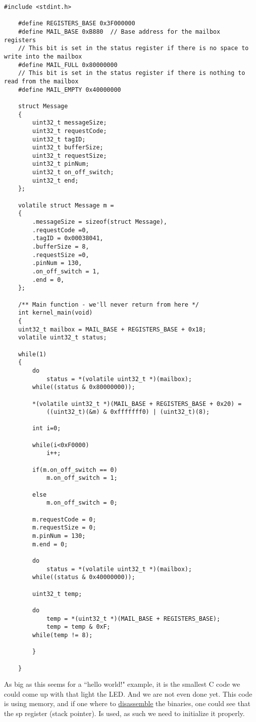 \documentclass[12pt]{book}
\begin{document}
\lstset{language=C}
\begin{lstlisting}[style=C]
	#include <stdint.h>
	
	#define REGISTERS_BASE 0x3F000000
	#define MAIL_BASE 0xB880  // Base address for the mailbox registers
	// This bit is set in the status register if there is no space to write into the mailbox
	#define MAIL_FULL 0x80000000
	// This bit is set in the status register if there is nothing to read from the mailbox
	#define MAIL_EMPTY 0x40000000
	
	struct Message
	{
		uint32_t messageSize;
		uint32_t requestCode;
		uint32_t tagID;
		uint32_t bufferSize;
		uint32_t requestSize;
		uint32_t pinNum;
		uint32_t on_off_switch;
		uint32_t end;
	};
	
	volatile struct Message m =
	{
		.messageSize = sizeof(struct Message),
		.requestCode =0,
		.tagID = 0x00038041,
		.bufferSize = 8,
		.requestSize =0,
		.pinNum = 130,
		.on_off_switch = 1,
		.end = 0,
	};
	
	/** Main function - we'll never return from here */
	int kernel_main(void)
	{
	uint32_t mailbox = MAIL_BASE + REGISTERS_BASE + 0x18;
	volatile uint32_t status;
	
	while(1)
	{
		do
			status = *(volatile uint32_t *)(mailbox);
		while((status & 0x80000000));
		
		*(volatile uint32_t *)(MAIL_BASE + REGISTERS_BASE + 0x20) = 
			((uint32_t)(&m) & 0xfffffff0) | (uint32_t)(8);
		
		int i=0;
		
		while(i<0xF0000)
			i++;
		
		if(m.on_off_switch == 0)
			m.on_off_switch = 1;
		
		else
			m.on_off_switch = 0;
		
		m.requestCode = 0;
		m.requestSize = 0;
		m.pinNum = 130;
		m.end = 0;
		
		do
			status = *(volatile uint32_t *)(mailbox);
		while((status & 0x40000000));
		
		uint32_t temp;
		
		do
			temp = *(uint32_t *)(MAIL_BASE + REGISTERS_BASE);
			temp = temp & 0xF;
		while(temp != 8);
		
		}
	
	}
\end{lstlisting}


As big as this seems for a ``hello world!" example, it is the smallest C code we could come up with that light the LED. And we are not even done yet. This code is using memory, and if one where to \hyperlink{dissassemble}{disassemble} the binaries, one could see that the sp register (stack pointer). Is used, as such we need to initialize it properly.
\end{document}
